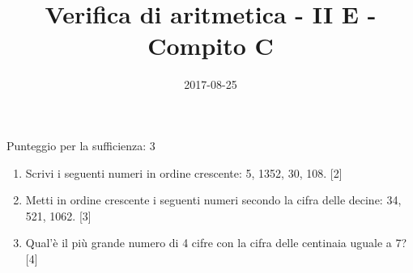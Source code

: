 \documentclass[11pt,fleqn]{article} %
\title{Verifica di aritmetica - II E - Compito C}
\date{2017-08-25}
\begin{document}
\maketitle
Punteggio per la sufficienza: 3
\begin{enumerate}

\item Scrivi i seguenti numeri in ordine crescente: 5, 1352, 30, 108. [2] 
\item Metti in ordine crescente i seguenti numeri secondo la cifra delle decine: 34, 521, 1062. [3] 
\item Qual'è il più grande numero di 4 cifre con la cifra delle centinaia uguale a 7? [4] 
\end{enumerate}
\end{document}
